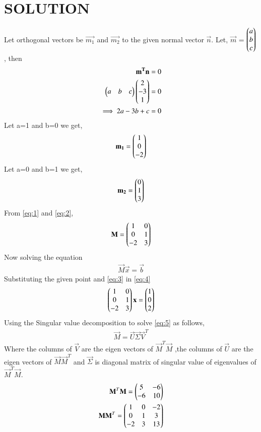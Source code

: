 \documentclass[journal,12pt,twocolumn]{IEEEtran}
\begin{document}
\section{SOLUTION}
Let orthogonal vectors be $\vec{m_1}$ and $\vec{m_2}$ to the given normal vector $\vec{n}$. Let, $\vec{m}$ = $\begin{pmatrix}a\\b\\c\end{pmatrix}$, then
\begin{align}
\mathbf{m^T}\mathbf{n} = 0\\
\begin{pmatrix}a&b&c\end{pmatrix}\begin{pmatrix}2\\-3\\1\end{pmatrix} = 0\\
\implies 2a-3b+c = 0
\end{align}
Let a=1 and b=0 we get,
\begin{align}
\mathbf{m_1} = \begin{pmatrix}1\\0\\-2\end{pmatrix} \label{eq:1}
\end{align}
Let a=0 and b=1 we get,
\begin{align}
\mathbf{m_2} = \begin{pmatrix}0\\1\\3\end{pmatrix} \label{eq:2}
\end{align}
From \eqref{eq:1} and \eqref{eq:2},
\begin{align}
\mathbf{M}= \begin{pmatrix}1&0\\0&1\\-2&3\end{pmatrix} \label{eq:3}
\end{align}
Now solving the equation
\begin{align}
\vec{M}\vec{x} = \vec{b}\label{eq:4}
\end{align}
Substituting the given point and \eqref{eq:3} in \eqref{eq:4}
\begin{align}
\begin{pmatrix}1&0\\0&1\\-2&3\end{pmatrix}\mathbf{x}=\begin{pmatrix}1\\0\\2\end{pmatrix}\label{eq:5}
\end{align}
Using the Singular value decomposition to solve \eqref{eq:5} as follows,
\begin{align}
\vec{M}=\vec{U}\vec{\Sigma}\vec{V}^T\label{eq:6}
\end{align}
Where the columns of $\vec{V}$ are the eigen vectors of $\vec{M}^T\vec{M}$ ,the columns of $\vec{U}$ are the eigen vectors of $\vec{M}\vec{M}^T$ and $\vec{\Sigma}$ is diagonal matrix of singular value of eigenvalues of $\vec{M}^T\vec{M}$.
\begin{align}
\mathbf{M}^T\mathbf{M}=\begin{pmatrix}5&-6\\-6&10\end{pmatrix}\label{eq:7}\\
\mathbf{M}\mathbf{M}^T =\begin{pmatrix}1&0&-2\\0&1&3\\-2&3&13\end{pmatrix}
\end{align}
\end{document}
